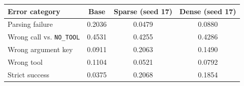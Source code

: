 
\begin{tabular}{lSSS}
\toprule
Error category & {Base} & {Sparse (seed 17)} & {Dense (seed 17)} \\
\midrule
Parsing failure & 0.2036 & 0.0479 & 0.0880 \\
Wrong call vs. \texttt{NO\_TOOL} & 0.4531 & 0.4255 & 0.4286 \\
Wrong argument key & 0.0911 & 0.2063 & 0.1490 \\
Wrong tool & 0.1104 & 0.0521 & 0.0792 \\
Strict success & 0.0375 & 0.2068 & 0.1854 \\
\bottomrule
\end{tabular}
